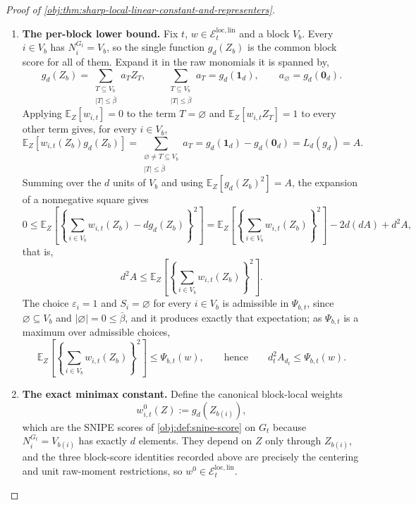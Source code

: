 \begin{proof}[Proof of \cref{obj:thm:sharp-local-linear-constant-and-representers}]
\begin{enumerate}
\item \textbf{The per-block lower bound.}  Fix \(t\), \(w\in\mathcal E_t^{\mathrm{loc,lin}}\) and a block \(V_b\).  Every \(i\in V_b\) has \(N_i^{G_t}=V_b\), so the single function \(g_{d}(Z_b)\) is the common block score for all of them.  Expand it in the raw monomials it is spanned by,
\[
g_{d}(Z_b)=\sum_{\substack{T\subseteq V_b\\ |T|\le\bar\beta}}a_TZ_T,
\qquad
\sum_{\substack{T\subseteq V_b\\ |T|\le\bar\beta}}a_T=g_{d}(\mathbf 1_{d}),
\qquad
a_\varnothing=g_{d}(\mathbf 0_{d}).
\]
Applying \(\mathbb E_Z[w_{i,t}]=0\) to the term \(T=\varnothing\) and \(\mathbb E_Z[w_{i,t}Z_T]=1\) to every other term gives, for every \(i\in V_b\),
\[
\mathbb E_Z[w_{i,t}(Z_b)g_{d}(Z_b)]
=
\sum_{\substack{\varnothing\ne T\subseteq V_b\\ |T|\le\bar\beta}}a_T
=
g_{d}(\mathbf 1_{d})-g_{d}(\mathbf 0_{d})
=
L_{d}(g_{d})
=
A .
\]
Summing over the \(d\) units of \(V_b\) and using \(\mathbb E_Z[g_{d}(Z_b)^2]=A\), the expansion of a nonnegative square gives
\[
0\le
\mathbb E_Z\!\left[
\left\{\sum_{i\in V_b}w_{i,t}(Z_b)-dg_{d}(Z_b)\right\}^2
\right]
=
\mathbb E_Z\!\left[
\left\{\sum_{i\in V_b}w_{i,t}(Z_b)\right\}^2
\right]
-2d(dA)+d^2A ,
\]
that is,
\[
d^2A
\le
\mathbb E_Z\!\left[
\left\{\sum_{i\in V_b}w_{i,t}(Z_b)\right\}^2
\right].
\]
The choice \(\varepsilon_i=1\) and \(S_i=\varnothing\) for every \(i\in V_b\) is admissible in \(\Psi_{b,t}\), since \(\varnothing\subseteq V_b\) and \(|\varnothing|=0\le\bar\beta\), and it produces exactly that expectation; as \(\Psi_{b,t}\) is a maximum over admissible choices,
\[
\mathbb E_Z\!\left[
\left\{\sum_{i\in V_b}w_{i,t}(Z_b)\right\}^2
\right]
\le\Psi_{b,t}(w),
\qquad\text{hence}\qquad
d_t^2A_{d_t}\le \Psi_{b,t}(w).
\]

\item \textbf{The exact minimax constant.}  Define the canonical block-local weights
\[
w^0_{i,t}(Z):=g_{d}(Z_{b(i)}),
\]
which are the SNIPE scores of \cref{obj:def:snipe-score} on \(G_t\) because \(N_i^{G_t}=V_{b(i)}\) has exactly \(d\) elements.  They depend on \(Z\) only through \(Z_{b(i)}\), and the three block-score identities recorded above are precisely the centering and unit raw-moment restrictions, so \(w^0\in\mathcal E_t^{\mathrm{loc,lin}}\). %


\end{enumerate}
\end{proof}
